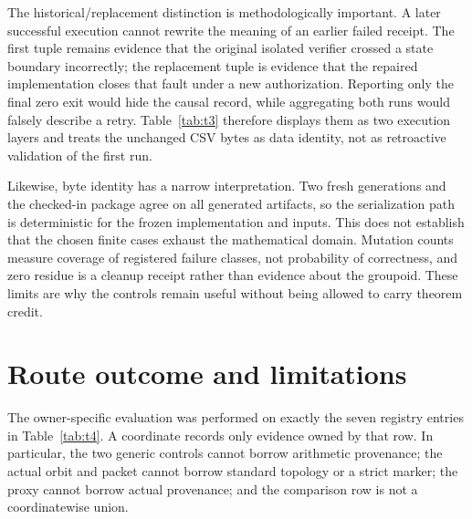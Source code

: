 \documentclass[12pt]{article}
\theoremstyle{definition}
\begin{document}
The historical/replacement distinction is methodologically important.  A later successful execution cannot rewrite the meaning of an earlier failed receipt.  The first tuple remains evidence that the original isolated verifier crossed a state boundary incorrectly; the replacement tuple is evidence that the repaired implementation closes that fault under a new authorization.  Reporting only the final zero exit would hide the causal record, while aggregating both runs would falsely describe a retry.  Table~\ref{tab:t3} therefore displays them as two execution layers and treats the unchanged CSV bytes as data identity, not as retroactive validation of the first run.

Likewise, byte identity has a narrow interpretation.  Two fresh generations and the checked-in package agree on all generated artifacts, so the serialization path is deterministic for the frozen implementation and inputs.  This does not establish that the chosen finite cases exhaust the mathematical domain.  Mutation counts measure coverage of registered failure classes, not probability of correctness, and zero residue is a cleanup receipt rather than evidence about the groupoid.  These limits are why the controls remain useful without being allowed to carry theorem credit.

\section{Route outcome and limitations}

The owner-specific evaluation was performed on exactly the seven registry entries in Table~\ref{tab:t4}.  A coordinate records only evidence owned by that row.  In particular, the two generic controls cannot borrow arithmetic provenance; the actual orbit and packet cannot borrow standard topology or a strict marker; the proxy cannot borrow actual provenance; and the comparison row is not a coordinatewise union.
\end{document}
